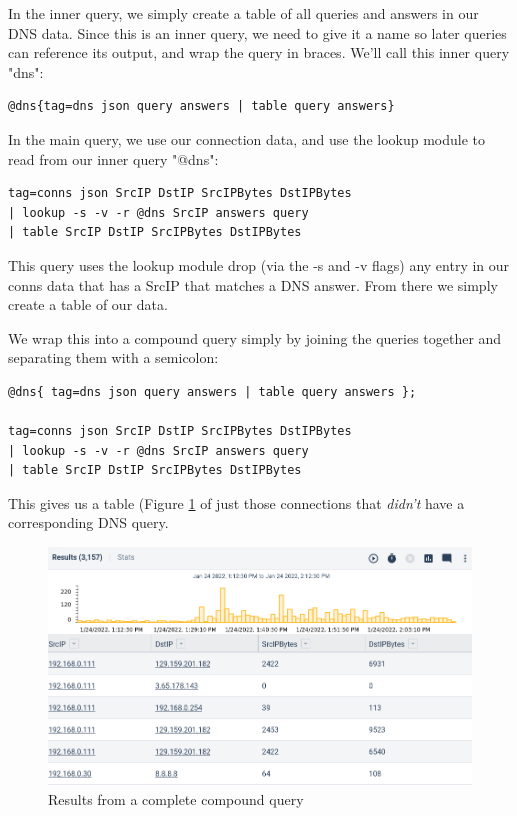 In the inner query, we simply create a table of all queries and answers in our
DNS data. Since this is an inner query, we need to give it a name so later
queries can reference its output, and wrap the query in braces. We'll call this
inner query "dns":

\begin{verbatim}
@dns{tag=dns json query answers | table query answers} 
\end{verbatim}

In the main query, we use our connection data, and use the lookup module to
read from our inner query "@dns":

\begin{verbatim}
tag=conns json SrcIP DstIP SrcIPBytes DstIPBytes 
| lookup -s -v -r @dns SrcIP answers query 
| table SrcIP DstIP SrcIPBytes DstIPBytes 
\end{verbatim}

This query uses the lookup module drop (via the -s and -v flags) any entry in
our conns data that has a SrcIP that matches a DNS answer. From there we simply
create a table of our data.

We wrap this into a compound query simply by joining the queries together and
separating them with a semicolon:

\begin{verbatim}
@dns{ tag=dns json query answers | table query answers };

tag=conns json SrcIP DstIP SrcIPBytes DstIPBytes 
| lookup -s -v -r @dns SrcIP answers query 
| table SrcIP DstIP SrcIPBytes DstIPBytes 
\end{verbatim}

This gives us a table (Figure \ref{fig:compound-table2} of just those connections that \emph{didn't} have a corresponding DNS
query.

\begin{figure}
	\includegraphics[width=0.8\linewidth]{images/compound-table2.png}
	\caption{Results from a complete compound query}
	\label{fig:compound-table2}
\end{figure}

